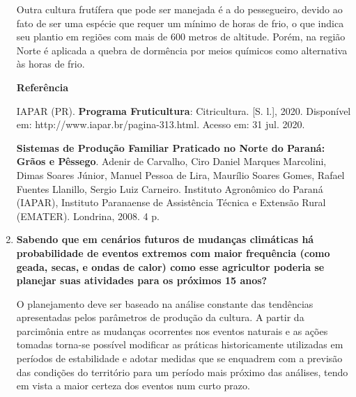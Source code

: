 \documentclass[a4paper, 12pt, brazilian]{article}
\begin{document}
\begin{enumerate}
		\hspace{.5cm}Outra cultura frutífera que pode ser manejada é a do pessegueiro, devido ao fato de ser uma espécie que requer um mínimo de horas de frio, o que indica seu plantio em regiões com mais de 600 metros de altitude. Porém, na região Norte é aplicada a quebra de dormência por meios químicos como alternativa às horas de frio.
		
		\textbf{Referência}
		
		IAPAR (PR). \textbf{Programa Fruticultura}: Citricultura. [S. l.], 2020. Disponível em: http://w\-ww.iapar.br/pagina-313.html. Acesso em: 31 jul. 2020.
		
		\textbf{Sistemas de Produção Familiar Praticado no Norte do Paraná: Grãos e Pêssego}. Adenir de Carvalho, Ciro Daniel Marques Marcolini,
		Dimas Soares Júnior, Manuel Pessoa de Lira, Maurílio Soares Gomes, Rafael Fuentes Llanillo, Sergio Luiz Carneiro. Instituto Agronômico do
		Paraná (IAPAR), Instituto Paranaense de Assistência Técnica e Extensão Rural (EMATER). Londrina, 2008. 4 p.
		
		\item\textbf{Sabendo que em cenários futuros de mudanças climáticas há probabilidade de eventos extremos com maior frequência (como geada, secas, e ondas de calor) como esse agricultor poderia se planejar suas atividades para os próximos 15 anos?}
		
		\hspace{.5cm}O planejamento deve ser baseado na análise constante das tendências apresentadas pelos parâmetros de produção da cultura. A partir da parcimônia entre as mudanças ocorrentes nos eventos naturais e as ações tomadas torna-se possível modificar as práticas historicamente utilizadas em períodos de estabilidade e adotar medidas que se enquadrem com a previsão das condições do território para um período mais próximo das análises, tendo em vista a maior certeza dos eventos num curto prazo. 
	\end{enumerate}
\end{document}
